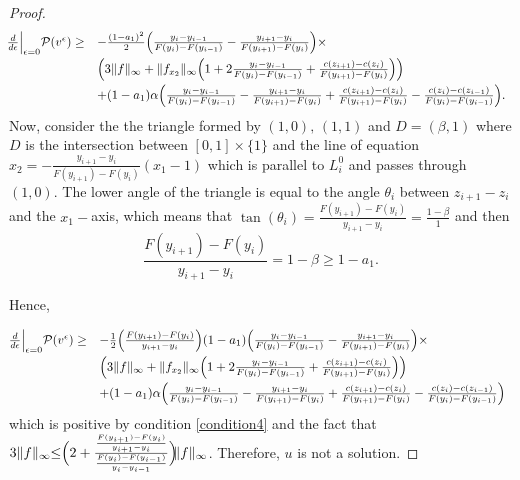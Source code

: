 \documentclass[12pt,reqno]{amsart}
\begin{document}
\begin{proof}
\[\hspace{-0.25cm}\begin{array}{ll}
\frac{d}{d\epsilon}\Big|_{\epsilon=0} \mathcal P(v^\epsilon)\ge&-\frac{(1-a_1)^2}{2}\Big(\frac{y_i-y_{i-1}}{F(y_i)-F(y_{i-1})}-\frac{y_{i+1}-y_i}{F(y_{i+1})-F(y_i)}\Big)\times\vspace{3pt}\\
&\Big(3\|f\|_\infty+\|f_{x_2}\|_\infty\Big(1+2\frac{y_{i}-y_{i-1}}{F(y_{i})-F(y_{i-1})}+\frac{c(z_{i+1})-c(z_i)}{F(y_{i+1})-F(y_i)}\Big)\Big)\vspace{3pt}\\
&+(1-a_1)\alpha\Big(\frac{y_{i}-y_{i-1}}{F(y_{i})-F(y_{i-1})}-\frac{y_{i+1}-y_i}{F(y_{i+1})-F(y_{i})}+\frac{c(z_{i+1})-c(z_i)}{F(y_{i+1})-F(y_i)}-\frac{c(z_{i})-c(z_{i-1})}{F(y_i)-F(y_{i-1})}\Big).
\end{array}\]
Now, consider the the triangle formed by $(1,0),\,(1,1)$ and $D=(\beta,1)$ where $D$ is the intersection between $[0,1]\times\{1\}$ and the line  of equation $x_2=-\frac{y_{i+1}-y_{i}}{F(y_{i+1})-F(y_{i})}(x_1-1)$ which is parallel to $L_{i}^0$ and passes through $(1,0).$ The lower angle of the triangle is equal to the angle $\theta_{i}$ between $z_{i+1}-z_{i}$ and the $x_1-$axis, which means that $\tan(\theta_{i})=\frac{F(y_{i+1})-F(y_{i})}{y_{i+1}-y_{i}}=\frac{1-\beta}{1}$ and then 
\begin{equation}\label{tan ineq}
\frac{F(y_{i+1})-F(y_{i})}{y_{i+1}-y_{i}}=1-\beta\ge 1-a_1.
\end{equation}

Hence,

\[\begin{array}{ll}\hspace{-0.2cm}
\frac{d}{d\epsilon}\Big|_{\epsilon=0} \mathcal P(v^\epsilon)\ge&-\frac{1}{2}\Big(\frac{F(y_{i+1})-F(y_{i})}{y_{i+1}-y_{i}}\Big)(1-a_1)\Big(\frac{y_i-y_{i-1}}{F(y_i)-F(y_{i-1})}-\frac{y_{i+1}-y_i}{F(y_{i+1})-F(y_i)}\Big)\times \vspace{3pt}\\
&\Big(3\|f\|_\infty+\|f_{x_2}\|_\infty\Big(1+2\frac{y_{i}-y_{i-1}}{F(y_{i})-F(y_{i-1})}+\frac{c(z_{i+1})-c(z_i)}{F(y_{i+1})-F(y_i)}\Big)\Big)\vspace{3pt}\\
&+(1-a_1)\alpha\Big(\frac{y_{i}-y_{i-1}}{F(y_{i})-F(y_{i-1})}-\frac{y_{i+1}-y_i}{F(y_{i+1})-F(y_{i})}+\frac{c(z_{i+1})-c(z_i)}{F(y_{i+1})-F(y_i)}-\frac{c(z_{i})-c(z_{i-1})}{F(y_i)-F(y_{i-1})}\Big)
\end{array}\]
 which is positive by condition \ref{condition4} and the fact that $3\|f\|_\infty\hspace{-3pt}\le\hspace{-0.1cm} \Big( 2+\frac{\frac{F(y_{i+1})-F(y_{i})}{y_{i+1}-y_{i}}}{\frac{F(y_i)-F(y_{i-1})}{y_i-y_{i-1}}}\Big)\hspace{-0.1cm}\|f\|_\infty$. Therefore, $u$ is not a solution.
\end{proof}
\end{document}
